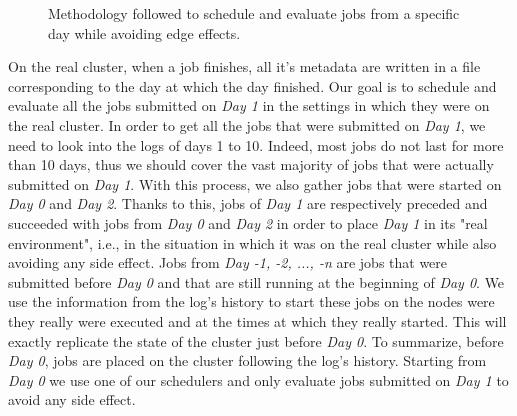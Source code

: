 \documentclass[conference,10pt]{IEEEtran}
\begin{document}
\begin{figure}[tb]
{
}
\caption{Methodology followed to schedule and evaluate jobs from a specific day while avoiding edge effects.}\label{fig.workload}
\label{fig.ex}
\end{figure}
On the real cluster, when a job finishes, all it's metadata
are written in a file corresponding to the day at which the day finished.
Our goal is to schedule and evaluate all the jobs submitted on 
\textit{Day 1} in the settings in which they were on the real cluster.
In order to get all the jobs that were submitted on \textit{Day 1}, we need to
look into the logs of days 1 to 10. Indeed, most jobs do not last for more than 10 days,
thus we should cover the vast majority of jobs that were actually submitted on 
\textit{Day 1}.
With this process, we also gather jobs that were started on \textit{Day 0} and \textit{Day 2}. 
Thanks to this, jobs of \textit{Day 1} are respectively preceded and succeeded with jobs from \textit{Day 0}
and \textit{Day 2} in order to place \textit{Day 1} in its "real environment",
i.e., in the situation in which it was on the real cluster while also avoiding any side effect.
Jobs from \textit{Day -1, -2, ..., -n} are jobs that were submitted before \textit{Day 0} and that are still running at the beginning of \textit{Day 0}.
We use the information from the log's history to start these jobs on the nodes
were they really were executed and at the times at which they really started.
This will exactly replicate the state of the cluster just before \textit{Day 0}.
To summarize, before \textit{Day 0}, jobs are placed on the cluster
following the log's history. Starting from \textit{Day 0} we 
use one of our schedulers and only evaluate jobs submitted on \textit{Day 1}
to avoid any side effect.
\end{document}
